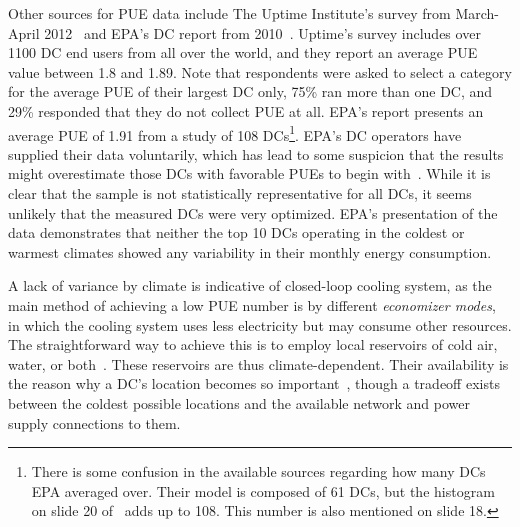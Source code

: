 \documentclass[officiallayout]{tktla}
\begin{document}
Other sources for PUE data include The Uptime Institute's survey from
March-April 2012~\cite{Stansberry2012} and EPA's DC report from
2010~\cite{Sullivan2010}. Uptime's survey includes over 1100 DC end users from
all over the world, and they report an average PUE value between 1.8 and 1.89.
Note that respondents were asked to select a category for the average PUE of
their largest DC only, 75\% ran more than one DC, and 29\% responded that they
do not collect PUE at all. EPA's report presents an average PUE of 1.91 from a
study of 108 DCs\footnote{There is some confusion in the available sources
regarding how many DCs EPA averaged over. Their model is composed of 61 DCs,
but the histogram on slide 20 of~\cite{Sullivan2010} adds up to 108.  This
number is also mentioned on slide 18.}. EPA's DC operators have supplied their
data voluntarily, which has lead to some suspicion that the results might
overestimate those DCs with favorable PUEs to begin with~\cite{Koomey2011}.
While it is clear that the sample is not statistically representative for all
DCs, it seems unlikely that the measured DCs were very optimized. EPA's
presentation of the data demonstrates that neither the top 10 DCs operating in
the coldest or warmest climates showed any variability in their monthly energy
consumption.

A lack of variance by climate is indicative of closed-loop cooling system, as
the main method of achieving a low PUE number is by different \emph{economizer
modes}, in which the cooling system uses less electricity but may consume
other resources. The straightforward way to achieve this is to employ local
reservoirs of cold air, water, or both~\cite{Niemann2010}. These reservoirs
are thus climate-dependent. Their availability is the reason why a DC's
location becomes so important~\cite{Gilder2006,Woods2010}, though a tradeoff
exists between the coldest possible locations and the available network and
power supply connections to them.
\end{document}
